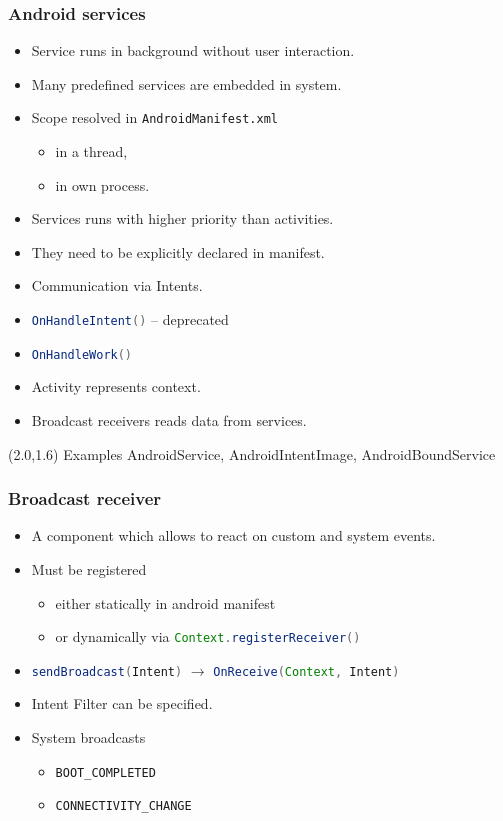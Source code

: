 \documentclass[10pt,xcolor=pdflatex]{beamer}
\newcommand{\inlinejava}{\lstinline[language={Java},basicstyle=\ttfamily,keepspaces]}
\newcommand{\file}[1]{\texttt{#1}}
\begin{document}
\begin{frame}[fragile]\frametitle{Android services}
	\begin{itemize}
		\item Service runs in background without user interaction.
		\item Many predefined services are embedded in system.
		\item Scope resolved in \file{AndroidManifest.xml}
          \begin{itemize}
        	\item in a thread,
            \item in own process.
          \end{itemize}
		\item Services runs with higher priority than activities.
		\item They need to be explicitly declared in manifest.
		\item Communication via Intents.
		\item[] {\inlinejava{OnHandleIntent()}} -- deprecated
        \item[] {\color{red}\inlinejava{OnHandleWork()}}
        \item Activity represents context.
		\item Broadcast receivers reads data from services.
	\end{itemize}
\begin{textblock}{15}(2.0,1.6)
    {\footnotesize Examples AndroidService, AndroidIntentImage, AndroidBoundService}
\end{textblock}
\end{frame}


\begin{frame}[fragile]\frametitle{Broadcast receiver}
	\begin{itemize}
		\item A component which allows to react on custom and system events.
		\item Must be registered
          \begin{itemize}
        	\item either statically in android manifest
            \item or dynamically via \color{red}\inlinejava{Context.registerReceiver()} 
          \end{itemize}
		\item {\color{red}\inlinejava{sendBroadcast(Intent)}} $\to$ {\color{red}\inlinejava{OnReceive(Context, Intent)}}
		\item Intent Filter can be specified.
		\item System broadcasts
          \begin{itemize}
        	\item \verb:BOOT_COMPLETED:
        	\item \verb:CONNECTIVITY_CHANGE:
          \end{itemize}
	\end{itemize}
\end{frame}
\end{document}
